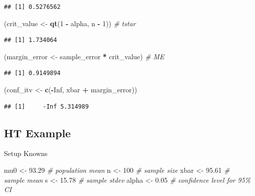 \documentclass[
]{article}
\newenvironment{Shaded}{\begin{snugshade}}{\end{snugshade}}
\newcommand{\CommentTok}[1]{\textcolor[rgb]{0.56,0.35,0.01}{\textit{#1}}}
\newcommand{\ConstantTok}[1]{\textcolor[rgb]{0.56,0.35,0.01}{#1}}
\newcommand{\DecValTok}[1]{\textcolor[rgb]{0.00,0.00,0.81}{#1}}
\newcommand{\FloatTok}[1]{\textcolor[rgb]{0.00,0.00,0.81}{#1}}
\newcommand{\FunctionTok}[1]{\textcolor[rgb]{0.13,0.29,0.53}{\textbf{#1}}}
\newcommand{\NormalTok}[1]{#1}
\newcommand{\OtherTok}[1]{\textcolor[rgb]{0.56,0.35,0.01}{#1}}
\newcommand{\SpecialCharTok}[1]{\textcolor[rgb]{0.81,0.36,0.00}{\textbf{#1}}}
\begin{document}
\begin{verbatim}
## [1] 0.5276562
\end{verbatim}

\begin{Shaded}
\begin{Highlighting}[]
\NormalTok{(crit\_value }\OtherTok{\textless{}{-}} \FunctionTok{qt}\NormalTok{(}\DecValTok{1} \SpecialCharTok{{-}}\NormalTok{ alpha, n }\SpecialCharTok{{-}} \DecValTok{1}\NormalTok{)) }\CommentTok{\# tstar}
\end{Highlighting}
\end{Shaded}

\begin{verbatim}
## [1] 1.734064
\end{verbatim}

\begin{Shaded}
\begin{Highlighting}[]
\NormalTok{(margin\_error }\OtherTok{\textless{}{-}}\NormalTok{ sample\_error }\SpecialCharTok{*}\NormalTok{ crit\_value) }\CommentTok{\# ME}
\end{Highlighting}
\end{Shaded}

\begin{verbatim}
## [1] 0.9149894
\end{verbatim}

\begin{Shaded}
\begin{Highlighting}[]
\NormalTok{(conf\_itv }\OtherTok{\textless{}{-}} \FunctionTok{c}\NormalTok{(}\SpecialCharTok{{-}}\ConstantTok{Inf}\NormalTok{, xbar }\SpecialCharTok{+}\NormalTok{ margin\_error))}
\end{Highlighting}
\end{Shaded}

\begin{verbatim}
## [1]     -Inf 5.314989
\end{verbatim}

\subsection{HT Example}\label{ht-example}

Setup Knowns

\begin{Shaded}
\begin{Highlighting}[]
\NormalTok{mu0 }\OtherTok{\textless{}{-}} \FloatTok{93.29} \CommentTok{\# population mean}
\NormalTok{n }\OtherTok{\textless{}{-}} \DecValTok{100} \CommentTok{\# sample size}
\NormalTok{xbar }\OtherTok{\textless{}{-}} \FloatTok{95.61} \CommentTok{\# sample mean}
\NormalTok{s }\OtherTok{\textless{}{-}} \FloatTok{15.78} \CommentTok{\# sample stdev}
\NormalTok{alpha }\OtherTok{\textless{}{-}} \FloatTok{0.05} \CommentTok{\# confidence level for 95\% CI}
\end{Highlighting}
\end{Shaded}
\end{document}
